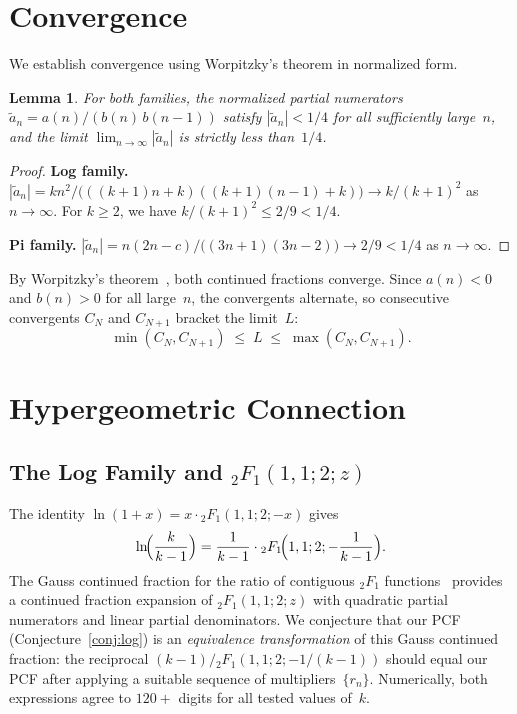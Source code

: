 \documentclass[11pt,a4paper]{article}
\theoremstyle{plain}
\newtheorem{lemma}[theorem]{Lemma}
\theoremstyle{remark}
\begin{document}
\section{Convergence}\label{sec:conv}

We establish convergence using Worpitzky's theorem in normalized form.

\begin{lemma}\label{lem:worpitzky}
For both families, the normalized partial numerators
$\tilde a_n = a(n)/(b(n)\,b(n{-}1))$ satisfy $|\tilde a_n| < 1/4$
for all sufficiently large~$n$, and the limit $\lim_{n\to\infty}|\tilde a_n|$
is strictly less than~$1/4$.
\end{lemma}
\begin{proof}
\textbf{Log family.}
$|\tilde a_n| = kn^2/\bigl(((k{+}1)n{+}k)((k{+}1)(n{-}1){+}k)\bigr)
\to k/(k{+}1)^2$ as $n\to\infty$.
For $k \ge 2$, we have $k/(k{+}1)^2 \le 2/9 < 1/4$.

\textbf{Pi family.}
$|\tilde a_n| = n(2n{-}c)/\bigl((3n{+}1)(3n{-}2)\bigr)
\to 2/9 < 1/4$ as $n\to\infty$.
\end{proof}

\noindent By Worpitzky's theorem~\cite{cuyt2008}, both continued
fractions converge.
Since $a(n) < 0$ and $b(n) > 0$ for all large~$n$, the convergents
alternate, so consecutive convergents $C_N$ and $C_{N+1}$ bracket
the limit~$L$:
\[
  \min(C_N, C_{N+1}) \;\le\; L \;\le\; \max(C_N, C_{N+1}).
\]

\section{Hypergeometric Connection}\label{sec:hyper}

\subsection{The Log Family and ${}_2F_1(1,1;2;z)$}

The identity $\ln(1+x) = x\cdot{}_2F_1(1,1;2;-x)$ gives
\begin{equation}\label{eq:ln-hyp}
  \ln\!\Bigl(\frac{k}{k-1}\Bigr)
  = \frac{1}{k-1}\cdot{}_2F_1\!\Bigl(1,1;2;-\frac{1}{k-1}\Bigr).
\end{equation}
The Gauss continued fraction for the ratio of contiguous ${}_2F_1$
functions~\cite{cuyt2008} provides a continued fraction expansion of
${}_2F_1(1,1;2;z)$ with quadratic partial numerators and linear partial
denominators.
We conjecture that our PCF (Conjecture~\ref{conj:log}) is an
\emph{equivalence transformation} of this Gauss continued fraction:
the reciprocal $(k-1)/{}_2F_1(1,1;2;-1/(k-1))$ should equal our PCF
after applying a suitable sequence of multipliers~$\{r_n\}$.
Numerically, both expressions agree to $120+$ digits for all tested
values of~$k$.
\end{document}
